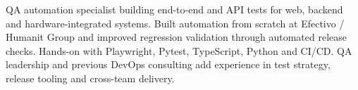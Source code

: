QA automation specialist building end-to-end and API tests for web, backend and
hardware-integrated systems. Built automation from scratch at Efectivo / Humanit
Group and improved regression validation through automated release checks.
Hands-on with Playwright, Pytest, TypeScript, Python and CI/CD. QA leadership and
previous DevOps consulting add experience in test strategy, release tooling and
cross-team delivery.
